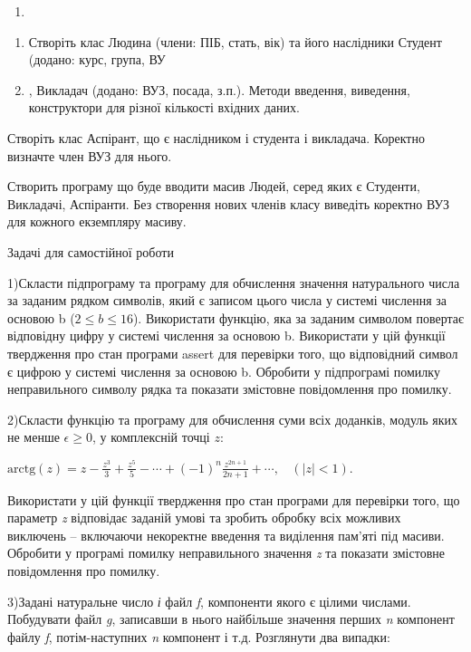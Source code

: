 \documentclass[]{article}
\makeatletter
\newcommand{\xslalph}[1]{\expandafter\@xslalph\csname c@#1\endcsname}
\newcommand{\@xslalph}[1]{%
    \ifcase#1\or а\or б\or в\or г\or д\or e\or є\or ж\or з\or i%
    \or й\or к\or л\or м\or н\or о\or п\or р\or с\or т%
    \or у\or ф\or х\or ц\or ч\or ш\or ю\or я\or аа\or бб\or вв%
    \else\@ctrerr\fi%
}
\makeatother
\begin{document}
\begin{enumerate}
\begin{enumerate}[label=\xslalph*)]
\begin{enumerate}
\begin{enumerate}[label=\xslalph*)]
\begin{enumerate}
\def\labelenumi{\arabic{enumi})}
\item
\end{enumerate}

\begin{enumerate}
\def\labelenumi{\arabic{enumi})}
\item
  Створіть клас Людина (члени: ПІБ, стать, вік) та його наслідники
  Студент (додано: курс, група, ВУ\item, Викладач (додано: ВУЗ, посада,
  з.п.). Методи введення, виведення, конструктори для різної кількості
  вхідних даних.
\end{enumerate}

Створіть клас Аспірант, що є наслідником і студента і викладача.
Коректно визначте член ВУЗ для нього.

Створить програму що буде вводити масив Людей, серед яких є Студенти,
Викладачі, Аспіранти. Без створення нових членів класу виведіть коректно
ВУЗ для кожного екземпляру масиву.

Задачі для самостійної роботи

1)Скласти підпрограму та програму для обчислення значення натурального
числа за заданим рядком символів, який є записом цього числа у системі
числення за основою b (\(2 \leq b \leq 16\)). Використати функцію, яка
за заданим символом повертає відповідну цифру у системі числення за
основою b. Використати у цій функції твердження про стан програми assert
для перевірки того, що відповідний символ є цифрою у системі числення за
основою b. Обробити у підпрограмі помилку неправильного символу рядка та
показати змістовне повідомлення про помилку.

2)Скласти функцію та програму для обчислення суми всіх доданків, модуль
яких не менше $\epsilon \ge 0$, у комплексній точці $z$:

\(\text{arctg}\left( z \right) = z - \frac{z^{3}}{3} + \frac{z^{5}}{5} - \cdots + {( - 1)}^{n}\frac{z^{2n + 1}}{2n + 1} + \cdots,\ \ \ \ (\left| z \right| < 1)\).

Використати у цій функції твердження про стан програми для перевірки
того, що параметр \emph{z} відповідає заданій умові та зробить обробку
всіх можливих виключень -- включаючи некоректне введення та виділення
пам'яті під масиви. Обробити у програмі помилку неправильного значення
\emph{z} та показати змістовне повідомлення про помилку.

3)Задані натуральне число \emph{і} файл \emph{f}, компоненти якого є
цілими числами. Побудувати файл \emph{g}, записавши в нього найбільше
значення перших \emph{n} компонент файлу \emph{f}, потім-наступних
\emph{n} компонент і т.д. Розглянути два випадки:


\end{enumerate}
\end{enumerate}
\end{enumerate}
\end{enumerate}
\end{document}
